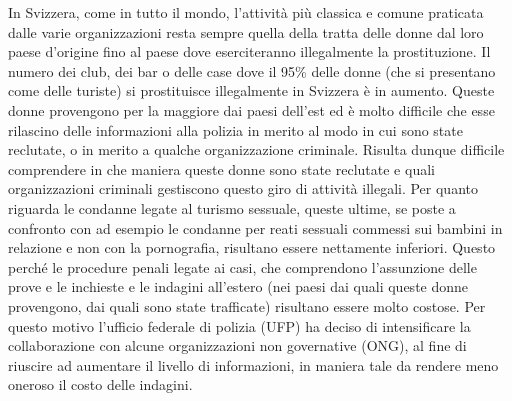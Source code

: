 \documentclass[a4paper, 11pt]{article}
\begin{document}

In Svizzera, come in tutto il mondo, l’attività più classica e comune praticata dalle varie organizzazioni resta sempre quella della tratta delle donne dal loro paese d’origine fino al paese dove eserciteranno illegalmente la prostituzione. Il numero dei club, dei bar o delle case dove il 95\% delle donne (che si presentano come delle turiste) si prostituisce illegalmente in Svizzera è in aumento. Queste donne provengono per la maggiore dai paesi dell’est ed è molto difficile che esse rilascino delle informazioni alla polizia in merito al modo in cui sono state reclutate, o in merito a qualche organizzazione criminale. Risulta dunque difficile comprendere in che maniera queste donne sono state reclutate e quali organizzazioni criminali gestiscono questo giro di attività illegali.
Per quanto riguarda le condanne legate al turismo sessuale, queste ultime, se poste a confronto con ad esempio le condanne per reati sessuali commessi sui bambini in relazione e non con la pornografia, risultano essere nettamente inferiori. Questo perché le procedure penali legate ai casi, che comprendono l’assunzione delle prove e le inchieste e le indagini all’estero (nei paesi dai quali queste donne provengono, dai quali sono state trafficate) risultano essere molto costose. Per questo motivo l’ufficio federale di polizia (UFP) ha deciso di intensificare la collaborazione con alcune organizzazioni non governative (ONG), al fine di riuscire ad aumentare il livello di informazioni, in maniera tale da rendere meno oneroso il costo delle indagini.

\newpage



\newpage



\newpage


\end{document}
